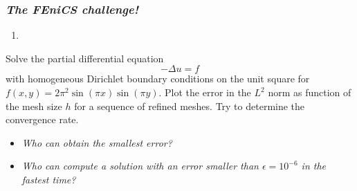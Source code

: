 \begin{frame}
  \frametitle{\emph{The FEniCS challenge!}}
  \begin{enumerate}
    \item 
  \end{enumerate}
  Solve the partial differential equation
  \begin{equation*}
    -\Delta u = f
  \end{equation*}
  with homogeneous Dirichlet boundary conditions on the unit square
  for $f(x, y) = 2\pi^2\sin(\pi x)\sin(\pi y)$. 
  Plot the error in the
  $L^2$ norm as function of the mesh size $h$ for a sequence of
  refined meshes. Try to determine the convergence rate.

  \begin{itemize}
  \item
    \emph{Who can obtain the smallest error?}
  \item
    \emph{Who can compute a solution with an error smaller than
    $\epsilon = 10^{-6}$ in the fastest time?}
  \end{itemize}
\end{frame}
